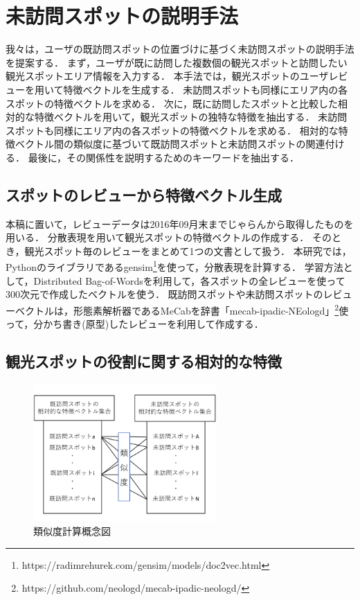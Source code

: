 \documentclass{deimj}
\begin{document}
\section{未訪問スポットの説明手法}
\label{sec:未訪問スポットの説明手法}
我々は，ユーザの既訪問スポットの位置づけに基づく未訪問スポットの説明手法を提案する．
まず，ユーザが既に訪問した複数個の観光スポットと訪問したい観光スポットエリア情報を入力する．
本手法では，観光スポットのユーザレビューを用いて特徴ベクトルを生成する．
未訪問スポットも同様にエリア内の各スポットの特徴ベクトルを求める．
次に，既に訪問したスポットと比較した相対的な特徴ベクトルを用いて，観光スポットの独特な特徴を抽出する．
未訪問スポットも同様にエリア内の各スポットの特徴ベクトルを求める．
相対的な特徴ベクトル間の類似度に基づいて既訪問スポットと未訪問スポットの関連付ける．
最後に，その関係性を説明するためのキーワードを抽出する．

\subsection{スポットのレビューから特徴ベクトル生成}
\label{subsec:スポットのレビューから特徴ベクトル生成}
本稿に置いて，レビューデータは2016年09月末までじゃらんから取得したものを用いる．
分散表現\cite{Codd10}を用いて観光スポットの特徴ベクトルの作成する．
そのとき，観光スポット毎のレビューをまとめて1つの文書として扱う．
本研究では，Pythonのライブラリであるgensim\footnote{https://radimrehurek.com/gensim/models/doc2vec.html}を使って，分散表現を計算する．
学習方法として，Distributed Bag-of-Wordsを利用して，各スポットの全レビューを使って300次元で作成したベクトルを使う．
既訪問スポットや未訪問スポットのレビューベクトルは，形態素解析器であるMeCab\cite{Codd11}を辞書「mecab-ipadic-NEologd」\footnote{https://github.com/neologd/mecab-ipadic-neologd/}使って，分かち書き(原型)したレビューを利用して作成する．

\subsection{観光スポットの役割に関する相対的な特徴}
\label{subsec:観光スポットの役割に関する相対的な特徴}
\begin{figure}[t]
  \begin{center}
    \includegraphics[clip,width=7.0cm]{picture/Photo_CosSim_jap.png}
    \caption{類似度計算概念図}
    \label{fig:Photo_CosSim}
  \end{center}
\end{figure}
\end{document}
